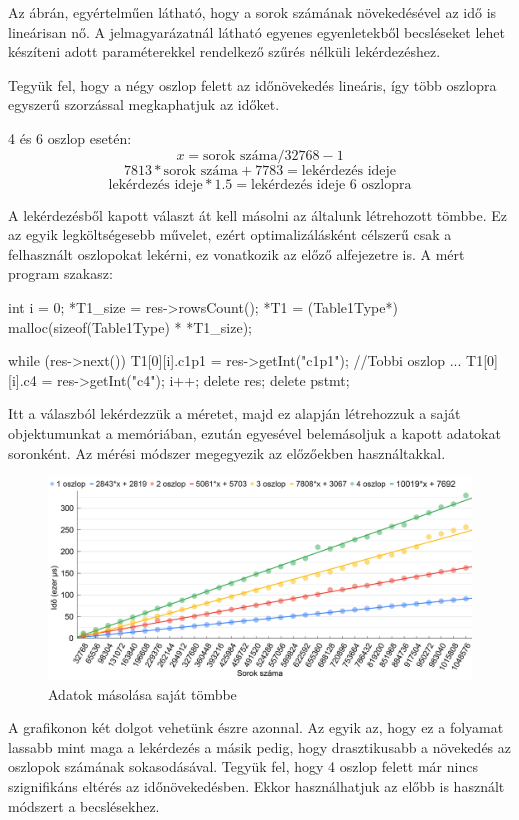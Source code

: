 Az ábrán, egyértelműen látható, hogy a sorok számának növekedésével az idő is lineárisan nő.
A jelmagyarázatnál látható egyenes egyenletekből becsléseket lehet készíteni adott paraméterekkel rendelkező szűrés nélküli lekérdezéshez. 

Tegyük fel, hogy a négy oszlop felett az időnövekedés lineáris, így több oszlopra egyszerű szorzással megkaphatjuk az időket.

4 és 6 oszlop esetén:
$$ x = \text{sorok száma}/32768 - 1 $$
$$ 7813 * \text{sorok száma} + 7783 = \text{lekérdezés ideje}$$
$$ \text{lekérdezés ideje} * 1.5 = \text{lekérdezés ideje 6 oszlopra} $$


A lekérdezésből kapott választ át kell másolni az általunk létrehozott tömbbe. Ez az egyik legköltségesebb művelet, ezért optimalizálásként célszerű csak a felhasznált oszlopokat lekérni, ez vonatkozik az előző alfejezetre is.
A mért program szakasz:
\begin{python}
int i = 0;
*T1_size = res->rowsCount();
*T1 = (Table1Type*) malloc(sizeof(Table1Type) * *T1_size);

while (res->next())
 {
	T1[0][i].c1p1 = res->getInt("c1p1");
	//Tobbi oszlop ...
	T1[0][i].c4 = res->getInt("c4");
	i++;
 }
delete res;
delete pstmt;
\end{python}
Itt a válaszból lekérdezzük a méretet, majd ez alapján létrehozzuk a saját objektumunkat a memóriában, ezután egyesével belemásoljuk 
a kapott adatokat soronként.
Az mérési módszer megegyezik az előzőekben használtakkal.
\begin{figure}[h!]
\centering
\includegraphics[width=\textwidth]{images/graph/ccopy.png}
\caption{Adatok másolása saját tömbbe}
\label{fig:schema}
\end{figure}
A grafikonon két dolgot vehetünk észre azonnal. Az egyik az, hogy ez a folyamat lassabb mint maga a lekérdezés a másik pedig, hogy drasztikusabb a növekedés az oszlopok számának sokasodásával.
Tegyük fel, hogy 4 oszlop felett már nincs szignifikáns eltérés az időnövekedésben. Ekkor használhatjuk az előbb is használt módszert a becslésekhez.

